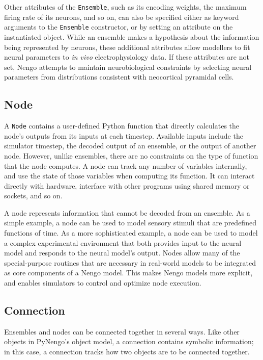 \documentclass{frontiersSCNS}
\begin{document}
Other attributes of the \texttt{Ensemble},
such as its encoding weights,
the maximum firing rate of its neurons,
and so on, can also be specified
either as keyword arguments
to the \texttt{Ensemble} constructor,
or by setting an attribute on the instantiated object.
While an ensemble makes a hypothesis
about the information being represented by neurons,
these additional attributes
allow modellers to fit
neural parameters to \textit{in vivo}
electrophysiology data.
If these attributes are not set,
Nengo attempts to maintain
neurobiological constraints
by selecting neural parameters
from distributions consistent with
neocortical pyramidal cells.

\subsection{Node}

A \texttt{Node} contains a user-defined
Python function that directly calculates
the node's outputs from its inputs at each timestep.
Available inputs include
the simulator timestep,
the decoded output of an ensemble,
or the output of another node.
However, unlike ensembles,
there are no constraints on the type
of function that the node computes.
A node can track any number of variables internally,
and use the state of those variables
when computing its function.
It can interact directly with hardware,
interface with other programs
using shared memory or sockets,
and so on.

A node represents information
that cannot be decoded from an ensemble.
As a simple example,
a node can be used to model sensory stimuli
that are predefined functions of time.
As a more sophisticated example,
a node can be used to model
a complex experimental environment that
both provides input to the neural model
and responds to the neural model's output.
Nodes allow many of the special-purpose
routines that are necessary in real-world
models to be integrated
as core components of a Nengo model.
This makes Nengo models more explicit,
and enables simulators
to control and optimize node execution.

\subsection{Connection}

Ensembles and nodes can be connected together
in several ways.
Like other objects in PyNengo's object model,
a connection contains symbolic information;
in this case, a connection tracks
how two objects are to be connected together.
\end{document}
